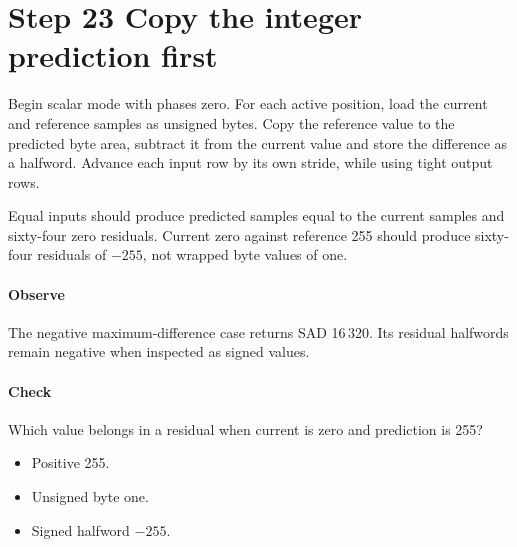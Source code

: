 \section{Step 23 Copy the integer prediction first}\label{h263-prediction-s03}
Begin scalar mode with phases zero. For each active position, load the current
and reference samples as unsigned bytes. Copy the reference value to the predicted
byte area, subtract it from the current value and store the difference as a
halfword. Advance each input row by its own stride, while using tight output rows.

Equal inputs should produce predicted samples equal to the current samples and
sixty-four zero residuals. Current zero against reference 255 should produce
sixty-four residuals of $-255$, not wrapped byte values of one.

\paragraph{Observe} The negative maximum-difference case returns SAD 16\,320.
Its residual halfwords remain negative when inspected as signed values.
\paragraph{Check} Which value belongs in a residual when current is zero and prediction is 255?
\begin{itemize}
  \item[A.] Positive 255.
  \item[B.] Unsigned byte one.
  \item[C.] Signed halfword $-255$.
\end{itemize}
